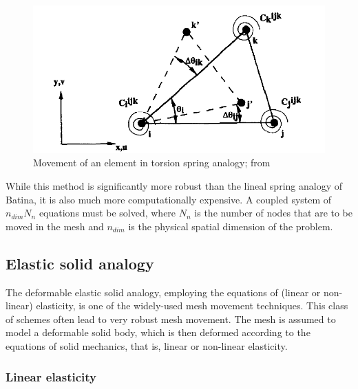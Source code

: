  \begin{figure}
 	\centering
 	\includegraphics[scale=0.25]{torsionspring}
 	\caption{Movement of an element in torsion spring analogy; from \cite{mm:torsionsprings}}
 	\label{f:torsion}
 \end{figure}
 
 While this method is significantly more robust than the lineal spring analogy of Batina, it is also much more computationally expensive. A coupled system of $n_{dim} N_n$ equations must be solved, where $N_n$ is the number of nodes that are to be moved in the mesh and $n_{dim}$ is the physical spatial dimension of the problem.
 
 \subsection{Elastic solid analogy}
 
 The deformable elastic solid analogy, employing the equations of (linear or non-linear) elasticity, is one of the widely-used mesh movement techniques. This class of schemes often lead to very robust mesh movement. The mesh is assumed to model a deformable solid body, which is then deformed according to the equations of solid mechanics, that is, linear or non-linear elasticity.
 
 \subsubsection{Linear elasticity}
 
